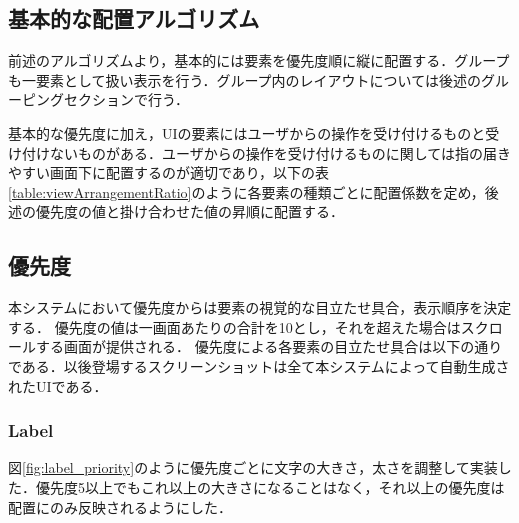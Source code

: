 \subsection{基本的な配置アルゴリズム}
前述のアルゴリズムより，基本的には要素を優先度順に縦に配置する．グループも一要素として扱い表示を行う．グループ内のレイアウトについては後述のグルーピングセクションで行う．

基本的な優先度に加え，UIの要素にはユーザからの操作を受け付けるものと受け付けないものがある．ユーザからの操作を受け付けるものに関しては指の届きやすい画面下に配置するのが適切であり，以下の表\ref{table:viewArrangementRatio}のように各要素の種類ごとに配置係数を定め，後述の優先度の値と掛け合わせた値の昇順に配置する．
\begin{table}[htbp]
\centering
{}
\caption{各要素の配置係数}
\label{table:viewArrangementRatio}
\end{table}

\subsection{優先度}
本システムにおいて優先度からは要素の視覚的な目立たせ具合，表示順序を決定する．
優先度の値は一画面あたりの合計を10とし，それを超えた場合はスクロールする画面が提供される．
優先度による各要素の目立たせ具合は以下の通りである．以後登場するスクリーンショットは全て本システムによって自動生成されたUIである．


\subsubsection{Label}
図\ref{fig:label_priority}のように優先度ごとに文字の大きさ，太さを調整して実装した．優先度5以上でもこれ以上の大きさになることはなく，それ以上の優先度は配置にのみ反映されるようにした．

